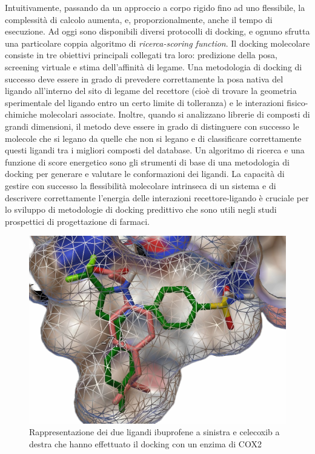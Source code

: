 Intuitivamente, passando da un approccio a corpo rigido fino ad uno flessibile, la complessità di calcolo aumenta, e, proporzionalmente, anche il tempo di esecuzione.\newline
Ad oggi sono disponibili diversi protocolli di docking, e ognuno sfrutta una particolare coppia algoritmo di \textit{ricerca-scoring function}.\newline
Il docking molecolare consiste in tre obiettivi principali collegati tra loro: predizione della posa, screening virtuale e stima dell'affinità di legame. Una metodologia di docking di successo deve essere in grado di prevedere correttamente la posa nativa del ligando all'interno del sito di legame del recettore (cioè di trovare la geometria sperimentale del ligando entro un certo limite di tolleranza) e le interazioni fisico-chimiche molecolari associate. Inoltre, quando si analizzano librerie di composti di grandi dimensioni, il metodo deve essere in grado di distinguere con successo le molecole che si legano da quelle che non si legano e di classificare correttamente questi ligandi tra i migliori composti del database. Un algoritmo di ricerca e una funzione di score energetico sono gli strumenti di base di una metodologia di docking per generare e valutare le conformazioni dei ligandi. La capacità di gestire con successo la flessibilità molecolare intrinseca di un sistema e di descrivere correttamente l'energia delle interazioni recettore-ligando è cruciale per lo sviluppo di metodologie di docking predittivo che sono utili negli studi prospettici di progettazione di farmaci\cite{guedes2014receptor}.

\begin{figure}[H]
    \centering
    \includegraphics[scale=0.5]{immagini/dockingMolecolare.png}
    \caption{Rappresentazione dei due ligandi ibuprofene a sinistra e celecoxib a destra che hanno effettuato il docking con un enzima di COX2}
    \label{fig:Docking Molecolare}
\end{figure}

